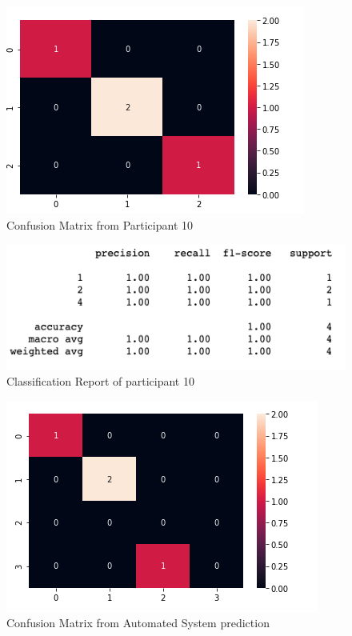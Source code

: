 \begin{figure}[!htp]
    \includegraphics[width=\textwidth]{Images/p10.png}
    \caption{Confusion Matrix from Participant 10}
    \label{fig:f11}
\end{figure}

\begin{figure}[!htp]
    \includegraphics[width=\textwidth]{Images/p10r.png}
    \caption{Classification Report of participant 10}
    \label{fig:f11}
\end{figure}

\pagebreak

\begin{figure}[!htp]
    \includegraphics[width=\textwidth]{Images/a10.png}
    \caption{Confusion Matrix from Automated System prediction}
    \label{fig:f11}
\end{figure}

